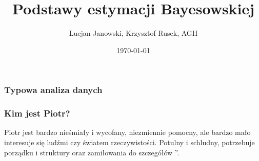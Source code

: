 \documentclass{beamer}
\title{Podstawy estymacji Bayesowskiej}
\author{Lucjan Janowski, Krzysztof Rusek, AGH }
\date{\today}
\begin{document}
\frame{\titlepage}


\begin{frame}
	\frametitle{
	Typowa analiza danych}


\end{frame}

%
%		
%	
%
%

\begin{frame}
\frametitle{	Kim jest Piotr?}
Piotr jest bardzo nieśmiały i wycofany, niezmiennie pomocny, ale bardzo mało interesuje się ludźmi czy światem rzeczywistości. Potulny i schludny, potrzebuje porządku i struktury oraz zamiłowania do szczegółów ”.	
\end{frame}
\end{document}
